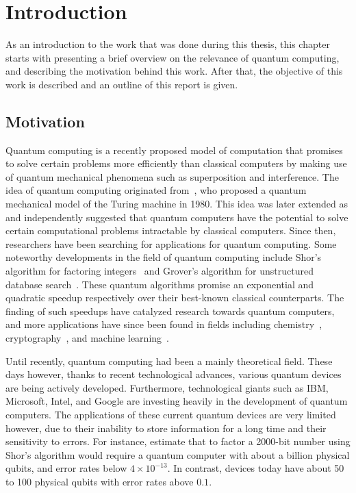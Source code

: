 \chapter{Introduction}
As an introduction to the work that was done during this thesis, this chapter starts with presenting a brief overview on the relevance of quantum computing, and describing the motivation behind this work.
After that, the objective of this work is described and an outline of this report is given.

\section{Motivation}
Quantum computing is a recently proposed model of computation that promises to solve certain problems more efficiently than classical computers by making use of quantum mechanical phenomena such as superposition and interference.
The idea of quantum computing originated from~\textcite{benioff1980computer}, who proposed a quantum mechanical model of the Turing machine in 1980.
This idea was later extended as \textcite{manin1980vychislimoe} and \textcite{feynman1982simulating} independently suggested that quantum computers have the potential to solve certain computational problems intractable by classical computers.
Since then, researchers have been searching for applications for quantum computing.
Some noteworthy developments in the field of quantum computing include Shor's algorithm for factoring integers~\cite{shor1999polynomial} and Grover's algorithm for unstructured database search~\cite{grover1996fast}.
These quantum algorithms promise an exponential and quadratic speedup respectively over their best-known classical counterparts.
The finding of such speedups have catalyzed research towards quantum computers, and more applications have since been found in fields including chemistry~\cite{mcardle2018quantum}, cryptography~\cite{bennett2014quantum}, and machine learning~\cite{biamonte2017quantum}.

Until recently, quantum computing had been a mainly theoretical field.
These days however, thanks to recent technological advances, various quantum devices are being actively developed.
Furthermore, technological giants such as IBM, Microsoft, Intel, and Google are investing heavily in the development of quantum computers.
The applications of these current quantum devices are very limited however, due to their inability to store information for a long time and their sensitivity to errors.
For instance, \textcite[Appendix~M]{fowler2012surface} estimate that to factor a 2000-bit number using Shor's algorithm would require a quantum computer with about a billion physical qubits, and error rates below $4 \times 10^{-13}$.
In contrast, devices today have about 50 to 100 physical qubits with error rates above $0.1$.

